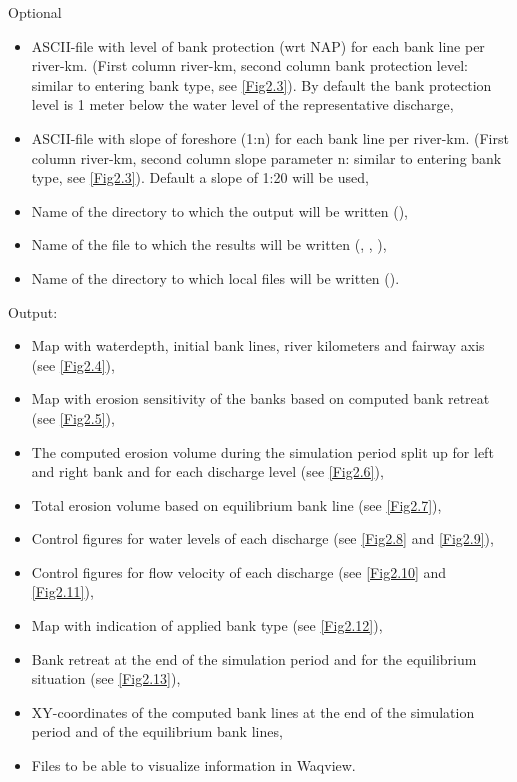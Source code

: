 Optional
\begin{itemize}
\item ASCII-file with level of bank protection (wrt NAP) for each bank line per river-km.
(First column river-km, second column bank protection level: similar to entering bank type, see \autoref{Fig2.3}).
By default the bank protection level is 1 meter below the water level of the representative discharge,
\item ASCII-file with slope of foreshore (1:n) for each bank line per river-km.
(First column river-km, second column slope parameter n: similar to entering bank type, see \autoref{Fig2.3}).
Default a slope of 1:20 will be used,
\item Name of the directory to which the output will be written (),
\item Name of the file to which the results will be written (, , ),
\item Name of the directory to which local files will be written ().
\end{itemize}

Output:

\begin{itemize}
\item Map with waterdepth, initial bank lines, river kilometers and fairway axis (see \autoref{Fig2.4}),
\item Map with erosion sensitivity of the banks based on computed bank retreat (see \autoref{Fig2.5}),
\item The computed erosion volume during the simulation period split up for left and right bank and for each discharge level (see \autoref{Fig2.6}),
\item Total erosion volume based on equilibrium bank line (see \autoref{Fig2.7}),
\item Control figures for water levels of each discharge (see \autoref{Fig2.8} and \autoref{Fig2.9}),
\item Control figures for flow velocity of each discharge (see \autoref{Fig2.10} and \autoref{Fig2.11}),
\item Map with indication of applied bank type (see \autoref{Fig2.12}),
\item Bank retreat at the end of the simulation period and for the equilibrium situation (see \autoref{Fig2.13}),
\item XY-coordinates of the computed bank lines at the end of the simulation period and of the equilibrium bank lines,
\item Files to be able to visualize information in Waqview.
\end{itemize}

